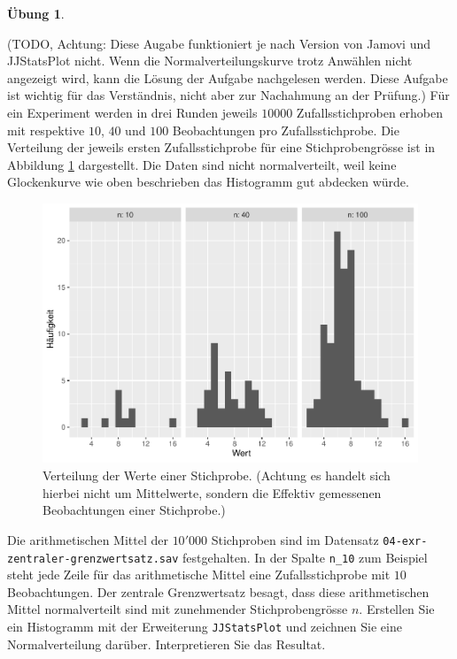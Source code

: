 \documentclass[
]{book}
\theoremstyle{definition}
\theoremstyle{definition}
\theoremstyle{definition}
\newtheorem{exercise}{Übung}[chapter]
\theoremstyle{definition}
\theoremstyle{remark}
\begin{document}
\begin{exercise}
\protect\hypertarget{exr:ki-approx-normal}{}\label{exr:ki-approx-normal}\leavevmode

(TODO, Achtung: Diese Augabe funktioniert je nach Version von Jamovi und JJStatsPlot nicht. Wenn die Normalverteilungskurve trotz Anwählen nicht angezeigt wird, kann die Lösung der Aufgabe nachgelesen werden. Diese Aufgabe ist wichtig für das Verständnis, nicht aber zur Nachahmung an der Prüfung.) Für ein Experiment werden in drei Runden jeweils \(10000\) Zufallsstichproben erhoben mit respektive \(10\), \(40\) und \(100\) Beobachtungen pro Zufallsstichprobe. Die Verteilung der jeweils ersten Zufallsstichprobe für eine Stichprobengrösse ist in Abbildung \ref{fig:ki-approx-normal1} dargestellt. Die Daten sind nicht normalverteilt, weil keine Glockenkurve wie oben beschrieben das Histogramm gut abdecken würde.

\begin{figure}
\centering
\includegraphics{aps_statistik1_files/figure-latex/ki-approx-normal1-1.pdf}
\caption{\label{fig:ki-approx-normal1}Verteilung der Werte einer Stichprobe. (Achtung es handelt sich hierbei nicht um Mittelwerte, sondern die Effektiv gemessenen Beobachtungen einer Stichprobe.)}
\end{figure}

Die arithmetischen Mittel der \(10'000\) Stichproben sind im Datensatz \texttt{04-exr-zentraler-grenzwertsatz.sav} festgehalten. In der Spalte \texttt{n\_10} zum Beispiel steht jede Zeile für das arithmetische Mittel eine Zufallsstichprobe mit \(10\) Beobachtungen. Der zentrale Grenzwertsatz besagt, dass diese arithmetischen Mittel normalverteilt sind mit zunehmender Stichprobengrösse \(n\). Erstellen Sie ein Histogramm mit der Erweiterung \texttt{JJStatsPlot} und zeichnen Sie eine Normalverteilung darüber. Interpretieren Sie das Resultat.

\end{exercise}
\end{document}
